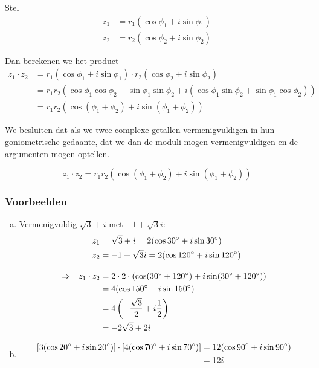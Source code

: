\documentclass[12pt,twoside,a4paper]{article}
\begin{document}
Stel
\begin{align*}
  z_1 &= r_1 ( \cos \phi_1 + i \sin \phi_1 )\\
  z_2 &= r_2 ( \cos \phi_2 + i \sin \phi_2 )
\end{align*}

Dan berekenen we het product
\begin{align*}
  z_1 \cdot z_2 &= r_1 ( \cos \phi_1 + i \sin \phi_1 ) \cdot r_2 ( \cos \phi_2 + i \sin \phi_2 )\\
            &= r_1 r_2 (\cos \phi_1 \cos \phi_2 - \sin \phi_1 \sin \phi_2 + i ( \cos \phi_1 \sin \phi_2 + \sin \phi_1 \cos \phi_2))\\
            &= r_1 r_2 (\cos (\phi_1 + \phi_2) + i \sin (\phi_1 + \phi_2))
\end{align*}

We besluiten dat als we twee complexe getallen vermenigvuldigen in hun goniometrische gedaante, dat we dan de moduli mogen vermenigvuldigen en de argumenten mogen optellen.\\

\begin{mdframed}
  \[
    z_1 \cdot z_2 = r_1 r_2 \left(\cos (\phi_1 + \phi_2) + i \sin (\phi_1 + \phi_2)\right)
  \]
\end{mdframed}

\subsubsection*{Voorbeelden}

\begin{enumerate}[(a)]
\item Vermenigvuldig $\sqrt{3} + i$ met $-1+\sqrt{3}i$:
  \begin{align*}
      &&       z_1 &= \sqrt{3} + i = 2(\cos 30^\circ + i\sin 30^\circ)\\
      &&       z_2 &= -1 + \sqrt{3}i = 2(\cos 120^\circ + i\sin 120^\circ)\\[1em]
    \Rightarrow && z_1 \cdot z_2 &= 2 \cdot 2 \cdot ( \cos( 30^\circ + 120^\circ ) + i\sin( 30^\circ + 120^\circ ) )\\
      &&           &= 4 (\cos 150^\circ + i\sin 150^\circ)\\
      &&           &= 4 \left( -\dfrac{\sqrt{3}}{2} + i \dfrac{1}{2} \right)\\
      &&           &= -2\sqrt{3} + 2i
  \end{align*}
\item
  \begin{align*}
    \left[3(\cos 20^\circ + i\sin 20^\circ)\right] \cdot \left[4(\cos 70^\circ + i\sin 70^\circ)\right]  &= 12 (\cos 90^\circ + i\sin 90^\circ)\\
                       &= 12i
  \end{align*}
\end{enumerate}
\end{document}
